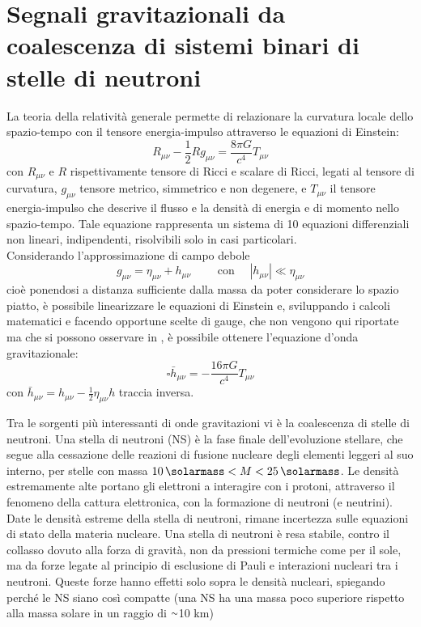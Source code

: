 \chapter{Segnali gravitazionali da coalescenza di  sistemi binari di stelle di neutroni}
\label{chapter:segnaleGWdaBNS}
La teoria della relatività generale permette di relazionare la curvatura locale dello spazio-tempo con il tensore energia-impulso attraverso le equazioni di Einstein:
\begin{equation}
	R_{\mu\nu} -\frac{1}{2}Rg_{\mu\nu}=\frac{8\pi G}{c^4}T_{\mu\nu}
\end{equation}
con $R_{\mu\nu}$ e $R$ rispettivamente tensore di Ricci e scalare di Ricci, legati al tensore di curvatura, $g_{\mu\nu}$ tensore metrico, simmetrico e non degenere, e $T_{\mu\nu}$ il tensore energia-impulso che descrive il flusso e la densità di energia e di momento nello spazio-tempo.
Tale equazione rappresenta un sistema di 10 equazioni differenziali non lineari, indipendenti, risolvibili solo in casi particolari. \\
Considerando l'approssimazione di campo debole 
\begin{equation}
	g_{\mu\nu} = \eta_{\mu\nu} + h_{\mu\nu}\quad\quad\text{ con }\quad |h_{\mu\nu}|\ll \eta_{\mu\nu} 
\end{equation}
cioè ponendosi a distanza sufficiente dalla massa da poter considerare lo spazio piatto, è possibile linearizzare le equazioni di Einstein e, sviluppando i calcoli matematici e facendo opportune scelte di gauge, che non vengono qui riportate ma che si possono osservare in \cite{maggiore2008gravitational}, è possibile ottenere l'equazione d'onda gravitazionale:
\begin{equation}
	\square\bar{h}_{\mu\nu} = -\frac{16\pi G}{c^4}T_{\mu\nu}
\end{equation}
con $\bar{h}_{\mu\nu} = h_{\mu\nu} - \frac{1}{2}\eta_{\mu\nu}h$ traccia inversa.

Tra le sorgenti più interessanti di onde gravitazioni vi è la coalescenza di stelle di neutroni.
Una stella di neutroni (NS) è la fase finale dell'evoluzione stellare, che segue alla cessazione delle reazioni di fusione nucleare degli elementi leggeri al suo interno, per stelle con massa $\SI{10}{\solarmass} < M < \SI{25}{\solarmass}$. Le densità estremamente alte portano gli elettroni a interagire con i protoni, attraverso il fenomeno della cattura elettronica, con la formazione di neutroni (e neutrini). Date le densità estreme della stella di neutroni, rimane incertezza sulle equazioni di stato della materia nucleare\cite{hobson2006general}.
Una stella di neutroni è resa stabile, contro il collasso dovuto alla forza di gravità, non da pressioni termiche come per il sole, ma da forze legate al principio di esclusione di Pauli e interazioni nucleari tra i neutroni. Queste forze hanno effetti solo sopra le densità nucleari, spiegando perché le NS siano così compatte (una NS ha una massa poco superiore rispetto alla massa solare in un raggio di $\smallsim$10 km)\cite{hartle2003gravity}

